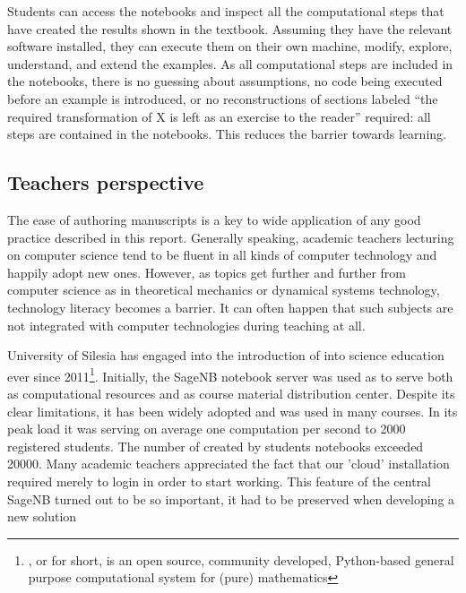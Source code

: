 \documentclass{deliverablereport}
\newcommand{\sagenb}{SageNB\xspace}
\begin{document}
Students can access the notebooks and inspect all the computational
steps that have created the results shown in the textbook. Assuming
they have the relevant software installed, they can execute them on
their own machine, modify, explore, understand, and extend the
examples. As all computational steps are included in the notebooks,
there is no guessing about assumptions, no code being executed before
an example is introduced, or no reconstructions of sections labeled
``the required transformation of X is left as an exercise to the
reader'' required: all steps are contained in the notebooks. This
reduces the barrier towards learning.



\subsection{Teachers perspective}

The ease of authoring manuscripts is a key to wide application of any
good practice described in this report. Generally speaking, academic
teachers lecturing on computer science tend to be fluent in all kinds
of computer technology and happily adopt new ones. However, as topics
get further and further from computer science as in theoretical
mechanics or dynamical systems technology, technology literacy becomes
a barrier. It can often happen that such subjects are not integrated
with computer technologies during teaching at all.


University of Silesia has engaged into the introduction of \SageMath
into science education ever since 2011\footnote{\SageMath, or \Sage
  for short, is an open source, community developed, Python-based
  general purpose computational system for (pure) mathematics}.
Initially, the \sagenb notebook server was
used as to serve both as computational resources and as course
material distribution center. Despite its clear limitations, it has
been widely adopted and was used in many courses. In its peak load it
was serving on average one computation per second to 2000 registered
students. The number of created by students notebooks exceeded
20000. Many academic teachers appreciated the fact that our 'cloud'
installation required merely to login in order to start working. This
feature of the central \sagenb turned out to be so important, it had to
be preserved when developing a new solution
\end{document}
